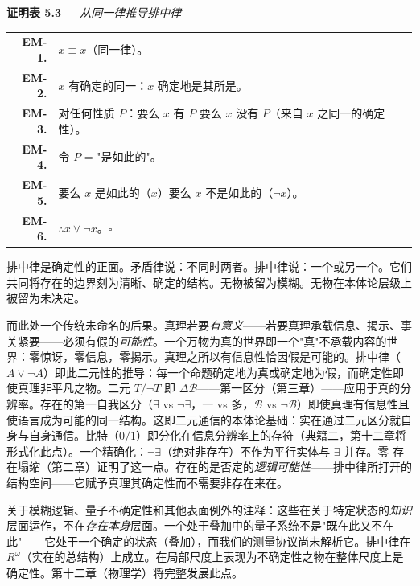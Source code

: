 \documentclass[10pt, openany, oneside]{book}
\renewcommand{\footnotesize}{\fontsize{8.5}{11}\selectfont}
\begin{document}
\textbf{证明表 5.3} --- \textit{从同一律推导排中律}

\vspace{0.5em}

{\footnotesize
\noindent\begin{tabular}{r p{}}
\textbf{EM-1.} & $x \equiv x$（同一律）。\\[0.3em]
\textbf{EM-2.} & $x$ 有确定的同一：$x$ 确定地是其所是。\\[0.3em]
\textbf{EM-3.} & 对任何性质 $P$：要么 $x$ 有 $P$ 要么 $x$ 没有 $P$（来自 $x$ 之同一的确定性）。\\[0.3em]
\textbf{EM-4.} & 令 $P$ = "是如此的"。\\[0.3em]
\textbf{EM-5.} & 要么 $x$ 是如此的（$x$）要么 $x$ 不是如此的（$\neg x$）。\\[0.3em]
\textbf{EM-6.} & $\therefore x \vee \neg x$。$\square$ \\[0.3em]
\end{tabular}
}

\vspace{0.8em}

\noindent 排中律是确定性的正面。矛盾律说：不同时两者。排中律说：一个或另一个。它们共同将存在的边界刻为清晰、确定的结构。无物被留为模糊。无物在本体论层级上被留为未决定。

而此处一个传统未命名的后果。真理若要\textit{有意义}——若要真理承载信息、揭示、事关紧要——必须有假的\textit{可能性}。一个万物为真的世界即一个"真"不承载内容的世界：零惊讶，零信息，零揭示。真理之所以有信息性恰因假是可能的。排中律（$A \vee \neg A$）即此二元性的推导：每一个命题确定地为真或确定地为假，而确定性即使真理非平凡之物。二元 $T/\neg T$ 即 $\Delta\mathcal{B}$——第一区分（第三章）——应用于真的分辨率。存在的第一自我区分（$\exists$ vs $\neg\exists$，一 vs 多，$\mathcal{B}$ vs $\neg\mathcal{B}$）即使真理有信息性且使语言成为可能的同一结构。这即二元通信的本体论基础：实在通过二元区分就自身与自身通信。比特（$0/1$）即分化在信息分辨率上的存符（典籍二，第十二章将形式化此点）。一个精确化：$\neg\exists$（绝对非存在）不作为平行实体与 $\exists$ 并存。零-存在塌缩（第二章）证明了这一点。存在的是否定的\textit{逻辑可能性}——排中律所打开的结构空间——它赋予真理其确定性而不需要非存在来在。

关于模糊逻辑、量子不确定性和其他表面例外的注释：这些在关于特定状态的\textit{知识}层面运作，不在\textit{存在本身}层面。一个处于叠加中的量子系统不是"既在此又不在此"——它处于一个确定的状态（叠加），而我们的测量协议尚未解析它。排中律在 $R^\omega$（实在的总结构）上成立。在局部尺度上表现为不确定性之物在整体尺度上是确定性。第十二章（物理学）将完整发展此点。
\end{document}
